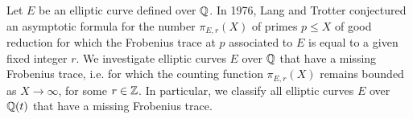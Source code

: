 \summary

Let $E$ be an elliptic curve defined over $\mathbb{Q}$.  In 1976, Lang and Trotter conjectured an asymptotic formula for the number $\pi_{E,r}(X)$ of primes $p \leq X$ of good reduction for which the Frobenius trace at $p$ associated to $E$ is equal to a given fixed integer $r$.  We investigate elliptic curves $E$  over $\mathbb{Q}$ that have a missing Frobenius trace, i.e. for which the counting function $\pi_{E,r}(X)$ remains bounded as $X \rightarrow \infty$, for some $r \in \mathbb{Z}$.  In particular, we classify all elliptic curves $E$ over $\mathbb{Q}(t)$ that have a missing Frobenius trace.